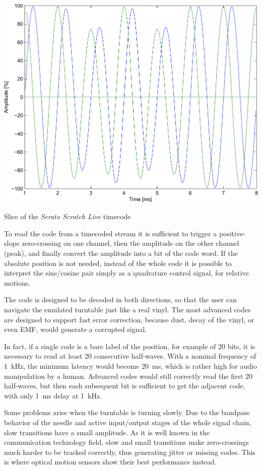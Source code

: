 \documentclass[a4paper,10pt]{article}
\makeatletter
\newenvironment{figurehere}{\def\@captype{figure}\vspace{2ex}}{\vspace{2ex}}
\makeatother
\begin{document}
\begin{multicols}{2}
\begin{figurehere}
	\centering
	\includegraphics[keepaspectratio=true,width=\columnwidth]{images/serato_timecode_slice.pdf}
	\caption{Slice of the \emph{Serato Scratch Live} timecode}
	\label{fig:serato_timecode_slice}
\end{figurehere}

To read the code from a timecoded stream it is sufficient to trigger a
positive-slope zero-crossing on one channel, then the amplitude on the other
channel (peak), and finally convert the amplitude into a bit of the code
word. If the absolute position is not needed, instead of the whole code it
is possible to interpret the sine/cosine pair simply as a quadrature control
signal, for relative motions.

The code is designed to be decoded in both directions, so that the user can
navigate the emulated turntable just like a real vinyl. The most advanced
codes are designed to support fast error correction, because dust, decay of
the vinyl, or even EMF, would generate a corrupted signal.

In fact, if a single code is a bare label of the position, for example of 20
bits, it is necessary to read at least 20 consecutive half-waves. With a
nominal frequency of 1~kHz, the minimum latency would become 20~ms, which is
rather high for audio manipulation by a human. Advanced codes would still
correctly read the first 20 half-waves, but then each subsequent bit is
sufficient to get the adjacent code, with only 1~ms delay at 1~kHz.

Some problems arise when the turntable is turning slowly. Due to the bandpass
behavior of the needle and active input/output stages of the whole signal
chain, slow transitions have a small amplitude. As it is well known in the
communication technology field, slow and small transitions make zero-crossings
much harder to be tracked correctly, thus generating jitter or missing codes.
This is where optical motion sensors show their best performance instead.



\end{multicols}
\end{document}
